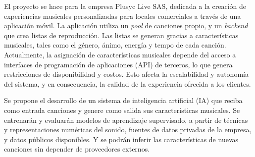 \documentclass[
11pt, %
]{charter}
\begin{document}



El proyecto se hace para la empresa Plusyc Live SAS, dedicada a la creación de experiencias musicales personalizadas para locales comerciales a través de una aplicación móvil. La aplicación utiliza un \textit{pool} de canciones propio, y un \textit{backend} que crea listas de reproducción. Las listas se generan gracias a características musicales, tales como el género, ánimo, energía y tempo de cada canción. Actualmente, la asignación de características musicales depende del acceso a interfaces de programación de aplicaciones (API) de terceros, lo que genera restricciones de disponibilidad y costos. Esto afecta la escalabilidad y autonomía del sistema, y en consecuencia, la calidad de la experiencia ofrecida a los clientes.

Se propone el desarrollo de un sistema de inteligencia artificial (IA) que reciba como entrada canciones y genere como salida sus características musicales. Se entrenarán y evaluarán modelos de aprendizaje supervisado, a partir de técnicas y representaciones numéricas del sonido, fuentes de datos privadas de la empresa, y datos públicos disponibles. Y se podrán inferir las características de nuevas canciones sin depender de proveedores externos.
\end{document}
